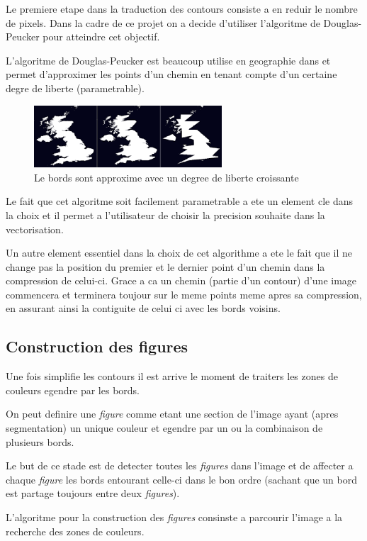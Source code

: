 \documentclass[twoside,openright,a4paper,11pt,french]{article}
\begin{document}
Le premiere etape dans la traduction des contours consiste a en reduir
le nombre de pixels. Dans la cadre de ce projet on a decide d'utiliser
l'algoritme de Douglas-Peucker pour atteindre cet objectif.

L'algoritme de Douglas-Peucker est beaucoup utilise en geographie dans
et permet d'approximer les points d'un chemin en tenant compte d'un
certaine degre de liberte (parametrable).

\begin{figure}[h]
\centering
\includegraphics[width=7cm]{./pics/dp1.eps}
\caption{Le bords sont approxime avec un degree de liberte croissante}
\label{fig:routcidr}
\end{figure}

Le fait que cet algoritme soit facilement parametrable a ete un
element cle dans la choix et il permet a l'utilisateur de choisir la
precision souhaite dans la vectorisation.

Un autre element essentiel dans la choix de cet algorithme a ete le
fait que il ne change pas la position du premier et le dernier point
d'un chemin dans la compression de celui-ci. Grace a ca un chemin
(partie d'un contour) d'une image commencera et terminera toujour sur
le meme points meme apres sa compression, en assurant ainsi la
contiguite de celui ci avec les bords voisins.



\subsection{Construction des figures}
Une fois simplifie les contours il est arrive le moment de traiters
les zones de couleurs egendre par les bords.

On peut definire une {\it figure} comme etant une section de l'image
ayant (apres segmentation) un unique couleur et egendre par un ou
la combinaison de plusieurs bords.

Le but de ce stade est de detecter toutes les {\it figures} dans l'image et
de affecter a chaque {\it figure} les bords entourant celle-ci dans le
bon ordre (sachant que un bord est partage toujours entre deux
{\it figures}).

L'algoritme pour la construction des {\it figures} consinste a parcourir
l'image a la recherche des zones de couleurs. 
\end{document}
